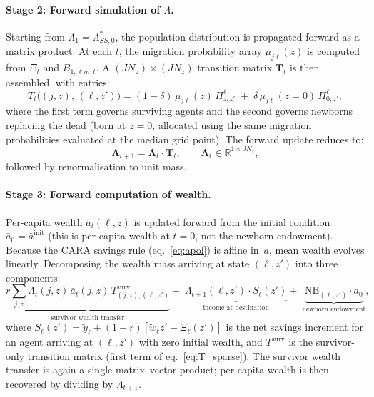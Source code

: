 \documentclass[12pt, a4paper]{article}
\begin{document}
\paragraph{Stage 2: Forward simulation of $\Lambda$.}
Starting from $\Lambda_1 = \Lambda^*_{SS,0}$, the population distribution is propagated forward as a matrix product. At each $t$, the migration probability array $\mu_{j\ell}(z)$ is computed from $\Xi_t$ and $B_{1,\ell m,t}$. A  $(JN_z)\times(JN_z)$ transition matrix $\mathbf{T}_t$ is then assembled, with entries:
\begin{equation}
  T_t\bigl((j,z),\,(\ell,z')\bigr)
  = (1-\delta)\,\mu_{j\ell}(z)\,\Pi^\ell_{z,z'}
  \;+\;\delta\,\mu_{j\ell}(z{=}0)\,\Pi^\ell_{0,z'},
  \label{eq:T_sparse}
\end{equation}
where the first term governs surviving agents and the second governs newborns replacing the dead (born at $z=0$, allocated using the same migration probabilities evaluated at the median grid point). The forward update reduces to:
\begin{equation}
  \boldsymbol{\Lambda}_{t+1} = \boldsymbol{\Lambda}_t \cdot \mathbf{T}_t, \qquad
  \boldsymbol{\Lambda}_t \in \mathbb{R}^{1 \times JN_z},
  \label{eq:Lambda_forward}
\end{equation}
followed by renormalisation to unit mass.

\paragraph{Stage 3: Forward computation of wealth.}
Per-capita wealth $\bar a_t(\ell,z)$ is updated forward from the initial condition $\bar a_0 = \bar a^\text{init}$ (this is per-capita wealth at $t = 0$, not the newborn endowment). Because the CARA savings rule (eq.~\ref{eq:apol}) is affine in~$a$, mean wealth evolves linearly. Decomposing the wealth mass arriving at state $(\ell, z')$ into three components:
\begin{equation}
  \underbrace{r\!\sum_{j,z}\Lambda_t(j,z)\,\bar a_t(j,z)\,T^{\mathrm{surv}}_{(j,z),(\ell,z')}}_{\text{survivor wealth transfer}}
  +\;\underbrace{\Lambda_{t+1}(\ell,z')\cdot S_\ell(z')}_{\text{income at destination}}
  +\;\underbrace{\text{NB}_{(\ell,z')}\cdot a_0}_{\text{newborn endowment}},
  \label{eq:a_bar_update}
\end{equation}
where $S_\ell(z') = \tilde y_\ell + (1{+}r)[\tilde w_\ell z' - \Xi_\ell(z')]$ is the net savings increment for an agent arriving at $(\ell,z')$ with zero initial wealth, and $T^{\mathrm{surv}}$ is the survivor-only transition matrix (first term of eq.~\ref{eq:T_sparse}). The survivor wealth transfer is again a single matrix--vector product; per-capita wealth is then recovered by dividing by $\Lambda_{t+1}$.
\end{document}
